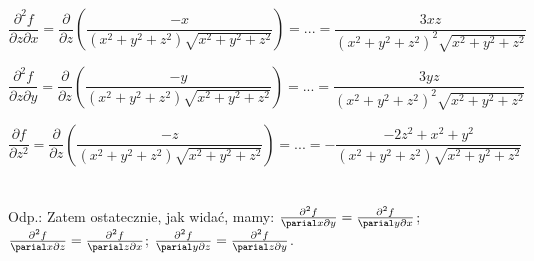\documentclass{article}
\begin{document}
$$\frac{\partial^{2}f}{\partial z \partial x} = \frac{\partial}{\partial z}(\frac{-x}{(x^2+y^2+z^2)\sqrt{x^2+y^2+z^2}}) = ... = \frac{3xz}{(x^2+y^2+z^2)^2\sqrt{x^2+y^2+z^2}}$$

$$\frac{\partial^{2}f}{\partial z \partial y} = \frac{\partial}{\partial z}(\frac{-y}{(x^2+y^2+z^2)\sqrt{x^2+y^2+z^2}}) = ... = \frac{3yz}{(x^2+y^2+z^2)^2\sqrt{x^2+y^2+z^2}}$$

$$\frac{\partial f}{\partial z^2} = \frac{\partial}{\partial z}(\frac{-z}{(x^2+y^2+z^2)\sqrt{x^2+y^2+z^2}}) = ... = - \frac{-2z^2+x^2+y^2}{(x^2+y^2+z^2)\sqrt{x^2+y^2+z^2}}$$ \\ \\
Odp.: Zatem ostatecznie, jak widać, mamy: $\frac{\partial^2 f}{\parial x \partial y}=\frac{\partial^2 f}{\parial y \partial x}$; $\frac{\partial^2 f}{\parial x \partial z} = \frac{\partial^2 f}{\parial z \partial x}$; $\frac{\partial^2 f}{\parial y \partial z} = \frac{\partial^2 f}{\parial z \partial y}$. 
\end{document}
